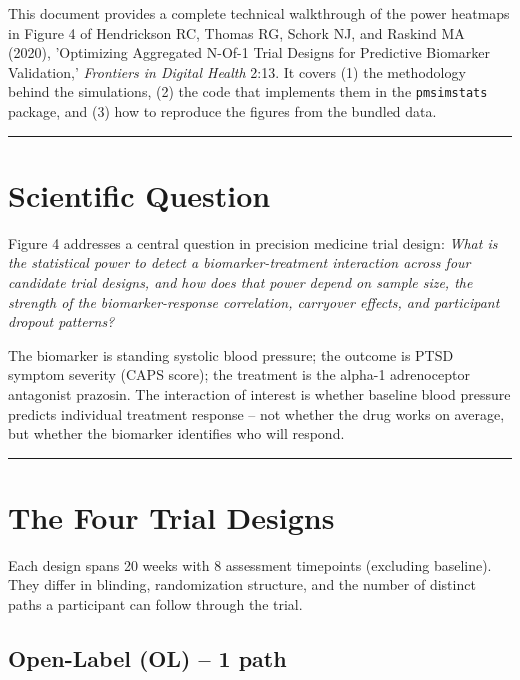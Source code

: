 \documentclass[11pt]{article}
\begin{document}
\maketitle
\thispagestyle{fancy}
\tableofcontents

This document provides a complete technical walkthrough of the power
heatmaps in Figure 4 of Hendrickson RC, Thomas RG, Schork NJ, and
Raskind MA (2020), 'Optimizing Aggregated N-Of-1 Trial Designs for
Predictive Biomarker Validation,' \textit{Frontiers in Digital Health}
2:13. It covers (1) the methodology behind the simulations, (2) the
code that implements them in the \texttt{pmsimstats} package, and (3) how
to reproduce the figures from the bundled data.

\bigskip\noindent\rule{\textwidth}{0.4pt}\bigskip

\section{Scientific Question}

Figure 4 addresses a central question in precision medicine trial
design: \textit{What is the statistical power to detect a
biomarker-treatment interaction across four candidate trial
designs, and how does that power depend on sample size, the
strength of the biomarker-response correlation, carryover effects,
and participant dropout patterns?}

The biomarker is standing systolic blood pressure; the outcome is
PTSD symptom severity (CAPS score); the treatment is the alpha-1
adrenoceptor antagonist prazosin. The interaction of interest is
whether baseline blood pressure predicts individual treatment
response -- not whether the drug works on average, but whether the
biomarker identifies who will respond.

\bigskip\noindent\rule{\textwidth}{0.4pt}\bigskip

\section{The Four Trial Designs}

Each design spans 20 weeks with 8 assessment timepoints (excluding
baseline). They differ in blinding, randomization structure, and
the number of distinct paths a participant can follow through the
trial.

\subsection{Open-Label (OL) -- 1 path}
\end{document}

